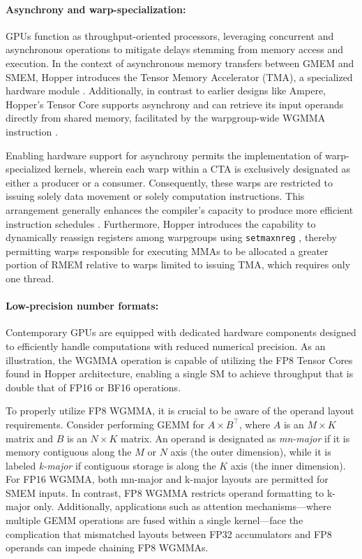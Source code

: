 \paragraph{Asynchrony and warp-specialization:}

GPUs function as throughput-oriented processors, leveraging concurrent and asynchronous operations to mitigate delays stemming from memory access and execution. In the context of asynchronous memory transfers between GMEM and SMEM, Hopper introduces the Tensor Memory Accelerator (TMA), a specialized hardware module \cite[\S7.29]{cuda}. Additionally, in contrast to earlier designs like Ampere, Hopper's Tensor Core supports asynchrony and can retrieve its input operands directly from shared memory, facilitated by the warpgroup-wide WGMMA instruction \cite[\S9.7.14]{ptx}.

Enabling hardware support for asynchrony permits the implementation of warp-specialized kernels, wherein each warp within a CTA is exclusively designated as either a producer or a consumer. Consequently, these warps are restricted to issuing solely data movement or solely computation instructions. This arrangement generally enhances the compiler’s capacity to produce more efficient instruction schedules \citep{warp-specialization-2011}. Furthermore, Hopper introduces the capability to dynamically reassign registers among warpgroups using \verb|setmaxnreg| \cite[\S9.7.17.1]{ptx}, thereby permitting warps responsible for executing MMAs to be allocated a greater portion of RMEM relative to warps limited to issuing TMA, which requires only one thread.

\paragraph{Low-precision number formats:}
\label{sec:low-precision-gpu}
Contemporary GPUs are equipped with dedicated hardware components designed to efficiently handle computations with reduced numerical precision. As an illustration, the WGMMA operation is capable of utilizing the FP8 Tensor Cores found in Hopper architecture, enabling a single SM to achieve throughput that is double that of FP16 or BF16 operations.

To properly utilize FP8 WGMMA, it is crucial to be aware of the operand layout requirements. Consider performing GEMM for $A \times B^{\top}$, where $A$ is an $M\times K$ matrix and $B$ is an $N\times K$ matrix. An operand is designated as \emph{mn-major} if it is memory contiguous along the $M$ or $N$ axis (the outer dimension), while it is labeled \emph{k-major} if contiguous storage is along the $K$ axis (the inner dimension). For FP16 WGMMA, both mn-major and k-major layouts are permitted for SMEM inputs. In contrast, FP8 WGMMA restricts operand formatting to k-major only. Additionally, applications such as attention mechanisms—where multiple GEMM operations are fused within a single kernel—face the complication that mismatched layouts between FP32 accumulators and FP8 operands can impede chaining FP8 WGMMAs.

